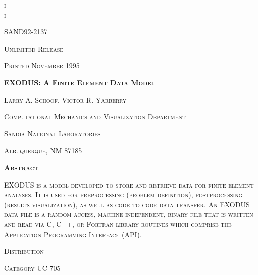 \documentclass{article}
\newcommand{\tab}{\hspace{5mm}}
\begin{document}
\tab  {\nobreakspace}
\tab  \textsc{i\tab }{\nobreakspace}\\

\tab  {\nobreakspace}
 {\nobreakspace}\tab  \textsc{i}


\begin{center}
\textsc{SAND92-2137}


\end{center}

\begin{center}
\textsc{Unlimited Release}


\end{center}

\begin{center}
\textsc{Printed November 1995}


\end{center}

\begin{center}

\begin{spacing}{2.0}
\textbf{\textsc{{\LARGE EXODUS: A Finite Element Data Model}}}


\end{spacing}

\end{center}

\begin{center}
\textsc{Larry A. Schoof, Victor R. Yarberry}


\end{center}

\begin{center}
\textsc{Computational Mechanics and Visualization Department}


\end{center}

\begin{center}
\textsc{Sandia National Laboratories}


\end{center}

\begin{center}
\textsc{Albuquerque, NM 87185}


\end{center}

\begin{center}
\textbf{\textsc{{\large Abstract}}}


\end{center}

\textsc{EXODUS is a model developed to store and retrieve data
for finite element analyses. It is used for preprocessing (problem
definition), postprocessing (results visualization), as well
as code to code data transfer. An EXODUS data file is a random
access, machine independent, binary file that is written and
read via C, C++, or Fortran library routines which comprise the
Application Programming Interface (API).}



\begin{flushright}
\textsc{Distribution}


\end{flushright}

\begin{flushright}
\textsc{Category UC-705}
\end{flushright}
\end{document}
